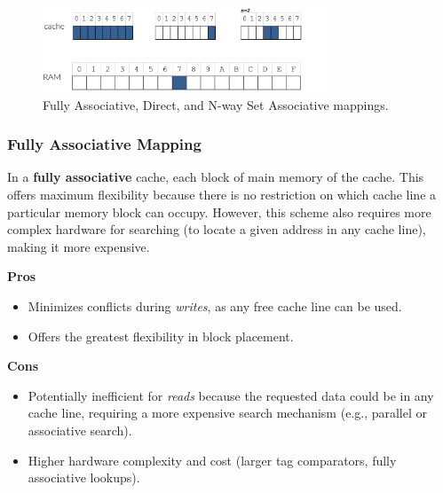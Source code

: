 \vspace{-1em}

\begin{figure}[H]
    \centering
    \includegraphics[width=0.77\textwidth]{assets/cache_mapping_ways.png}
    \caption{Fully Associative, Direct, and N-way Set Associative mappings.}\label{fig:cache_mapping_ways}
\end{figure}

\subsubsection{Fully Associative Mapping}
In a \textbf{fully associative} cache, each block of main memory  of the cache. This offers maximum flexibility because there is no restriction on which cache line a particular memory block can occupy. However, this scheme also requires more complex hardware for searching (to locate a given address in any cache line), making it more expensive.

\begin{minipage}[t]{0.48\textwidth}
    \textbf{Pros}
    \begin{itemize}
        \item Minimizes conflicts during \textit{writes}, as any free cache line can be used.
        \item Offers the greatest flexibility in block placement.
    \end{itemize}
\end{minipage}\hspace{1em}
\begin{minipage}[t]{0.48\textwidth}
    \textbf{Cons}
    \begin{itemize}
        \item Potentially inefficient for \textit{reads} because the requested data could be in any cache line, requiring a more expensive search mechanism (e.g., parallel or associative search).
        \item Higher hardware complexity and cost (larger tag comparators, fully associative lookups).
    \end{itemize}
\end{minipage}

